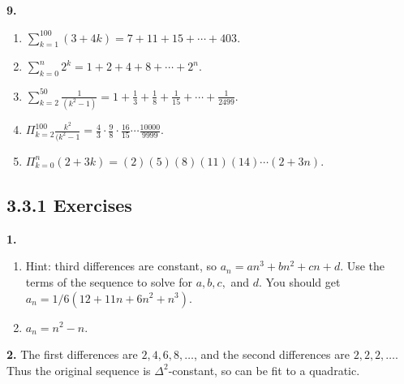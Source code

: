 \documentclass[10pt,]{book}
\theoremstyle{plain}
\theoremstyle{definition}
\theoremstyle{definition}
\theoremstyle{definition}
\numberwithin{equation}{chapter}
\def\d{\displaystyle}
\def\prod{\Pi}
\begin{document}
\par\smallskip
\noindent\textbf{9.}\quad{}\leavevmode%
\begin{enumerate}[label=(\alph*)]
\item\hypertarget{li-918}{}\(\d\sum_{k=1}^{100} (3+4k) = 7 + 11 + 15 + \cdots + 403\).%
\item\hypertarget{li-919}{}\(\d\sum_{k=0}^n 2^k = 1 + 2 + 4 + 8 + \cdots + 2^n\).%
\item\hypertarget{li-920}{}\(\d\sum_{k=2}^{50}\frac{1}{(k^2 - 1)} = 1 + \frac{1}{3} + \frac{1}{8} + \frac{1}{15} + \cdots + \frac{1}{2499}\).%
\item\hypertarget{li-921}{}\(\d\prod_{k=2}^{100}\frac{k^2}{(k^2-1} = \frac{4}{3}\cdot\frac{9}{8}\cdot\frac{16}{15}\cdots\frac{10000}{9999}\).%
\item\hypertarget{li-922}{}\(\d\prod_{k=0}^n (2+3k) = (2)(5)(8)(11)(14)\cdots(2+3n)\).%
\end{enumerate}
\par\smallskip
\subsection*{3.3.1 Exercises}
\noindent\textbf{1.}\quad{}\leavevmode%
\begin{enumerate}[label=(\alph*)]
\item\hypertarget{li-931}{}
Hint: third differences are constant, so \(a_n = an^3 + bn^2 + cn + d\).  Use the terms of the sequence to solve for \(a, b, c,\) and \(d\).  You should get \(a_n = 1/6 (12+11 n+6 n^2+n^3)\).
%
\item\hypertarget{li-932}{}\(a_n = n^2 - n\).%
\end{enumerate}
\par\smallskip
\noindent\textbf{2.}\quad{}
The first differences are \(2, 4, 6, 8, \ldots\), and the second differences are \(2, 2, 2, \ldots\). Thus the original sequence is \(\Delta^2\)-constant, so can be fit to a quadratic.
%
\par
\end{document}
